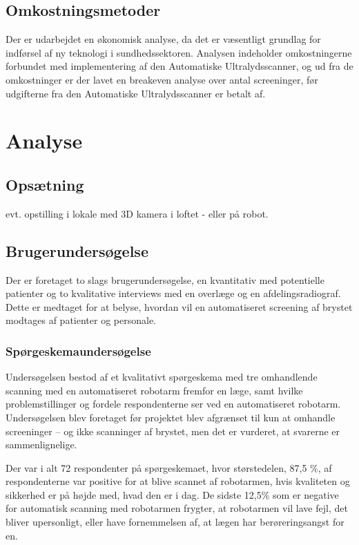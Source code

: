 \subsection{Omkostningsmetoder}
Der er udarbejdet en økonomisk analyse, da det er væsentligt grundlag for indførsel af ny teknologi i sundhedssektoren. Analysen indeholder omkostningerne forbundet med implementering af den Automatiske Ultralydsscanner, og ud fra de omkostninger er der lavet en breakeven analyse over antal screeninger, før udgifterne fra den Automatiske Ultralydsscanner er betalt af. 

\section{Analyse}
\subsection{Opsætning }
evt. opstilling i lokale med 3D kamera i loftet - eller på robot. 


\subsection{Brugerundersøgelse}
Der er foretaget to slags brugerundersøgelse, en kvantitativ med potentielle patienter og to kvalitative interviews med en overlæge og en afdelingsradiograf. Dette er medtaget for at belyse, hvordan vil en automatiseret screening af brystet modtages af patienter og personale. 

\subsubsection{Spørgeskemaundersøgelse}
Undersøgelsen bestod af et kvalitativt spørgeskema med tre omhandlende scanning med en automatiseret robotarm fremfor en læge, samt hvilke problemstillinger og fordele respondenterne ser ved en automatiseret robotarm.  Undersøgelsen blev foretaget før projektet blev afgrænset til kun at omhandle screeninger – og ikke scanninger af brystet, men det er vurderet, at svarerne er sammenlignelige. 

Der var i alt 72 respondenter på spørgeskemaet, hvor størstedelen, 87,5 \%, af respondenterne var positive for at blive scannet af robotarmen, hvis kvaliteten og sikkerhed er på højde med, hvad den er i dag. De sidste 12,5\% som er negative for automatisk scanning med robotarmen frygter, at robotarmen vil lave fejl, det bliver upersonligt, eller have fornemmelsen af, at lægen har berøreringsangst for en. 

